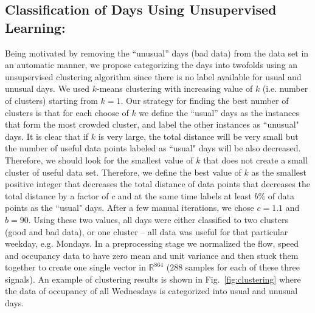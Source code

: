 \documentclass[twocolumn,10pt]{asme2e}
\begin{document}
\subsection{Classification of Days Using Unsupervised Learning:}
Being motivated by removing the ``unusual'' days (bad data) from the data set in an automatic manner, we propose categorizing the days into twofolds using an unsupervised clustering algorithm since there is no label available for usual and unusual days. We used $k$-means clustering with increasing value of $k$ (i.e. number of clusters) starting from $k=1$. Our strategy for finding the best number of clusters is that for each choose of $k$ we define the ``usual'' days as the instances that form the most crowded cluster, and label the other instances as ``unusual" days. It is clear that if $k$ is very large, the total distance will be very small but the number of useful data points labeled as ``usual" days will be also decreased. Therefore, we should look for the smallest value of $k$ that does not create a small cluster of useful data set. Therefore, we define the best value of $k$ as the smallest positive integer that decreases the total distance of data points that decreases the total distance by a factor of $c$ and at the same time labels at least $b\%$ of data points as the ``usual" days. After a few manual iterations, we chose $c=1.1$ and $b=90$. Using these two values, all days were either classified to two clusters (good and bad data), or one cluster -- all data was useful for that particular weekday, e.g. Mondays. In a preprocessing stage we normalized the flow, speed and occupancy data to have zero mean and unit variance and then stuck them together to create one single vector in $\mathbb{R}^{864}$ ($288$ samples for each of these three signals). An example of clustering results is shown in Fig.~\ref{fig:clustering} where the data of occupancy of all Wednesdays is categorized into usual and unusual days.
\end{document}
